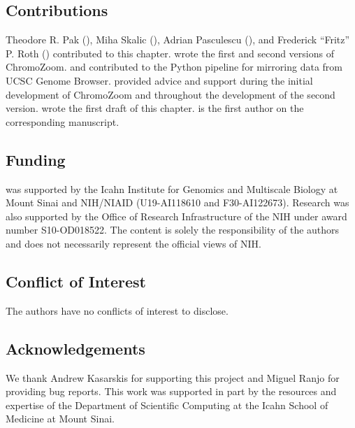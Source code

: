 \subsection*{Contributions}

Theodore R. Pak (), Miha Skalic (), Adrian Pasculescu (), and Frederick ``Fritz'' P. Roth () contributed to this chapter.  wrote the first and second versions of ChromoZoom.  and  contributed to the Python pipeline for mirroring data from UCSC Genome Browser.  provided advice and support during the initial development of ChromoZoom and throughout the development of the second version.  wrote the first draft of this chapter.  is the first author on the corresponding manuscript.

\subsection*{Funding}

 was supported by the Icahn Institute for Genomics and Multiscale Biology at Mount Sinai and NIH/NIAID (U19-AI118610 and F30-AI122673). Research was also supported by the Office of Research Infrastructure of the NIH under award number S10-OD018522. The content is solely the responsibility of the authors and does not necessarily represent the official views of NIH.

\subsection*{Conflict of Interest}

The authors have no conflicts of interest to disclose.

\subsection*{Acknowledgements}

We thank Andrew Kasarskis for supporting this project and Miguel Ranjo for providing bug reports. This work was supported in part by the resources and expertise of the Department of Scientific Computing at the Icahn School of Medicine at Mount Sinai.
